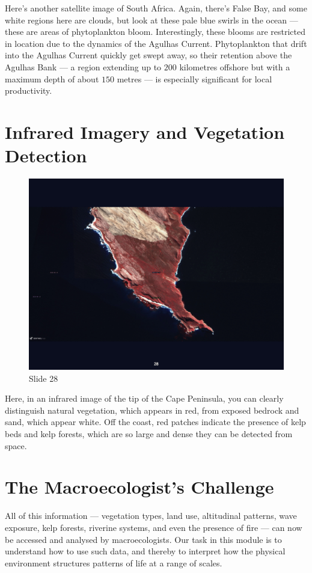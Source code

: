 \documentclass[
  10pt,
]{book}
\begin{document}
Here's another satellite image of South Africa. Again, there's False
Bay, and some white regions here are clouds, but look at these pale blue
swirls in the ocean --- these are areas of phytoplankton bloom.
Interestingly, these blooms are restricted in location due to the
dynamics of the Agulhas Current. Phytoplankton that drift into the
Agulhas Current quickly get swept away, so their retention above the
Agulhas Bank --- a region extending up to \(200\) kilometres offshore
but with a maximum depth of about \(150\) metres --- is especially
significant for local productivity.

\section{Infrared Imagery and Vegetation
Detection}\label{infrared-imagery-and-vegetation-detection}

\begin{figure}[ht]
\centering
\includegraphics[width=0.8\linewidth]{../images/BDC334/BDC334-028.jpeg}
\caption*{Slide 28}
\end{figure}

Here, in an infrared image of the tip of the Cape Peninsula, you can
clearly distinguish natural vegetation, which appears in red, from
exposed bedrock and sand, which appear white. Off the coast, red patches
indicate the presence of kelp beds and kelp forests, which are so large
and dense they can be detected from space.

\section{The Macroecologist's
Challenge}\label{the-macroecologists-challenge}

All of this information --- vegetation types, land use, altitudinal
patterns, wave exposure, kelp forests, riverine systems, and even the
presence of fire --- can now be accessed and analysed by
macroecologists. Our task in this module is to understand how to use
such data, and thereby to interpret how the physical environment
structures patterns of life at a range of scales.
\end{document}
